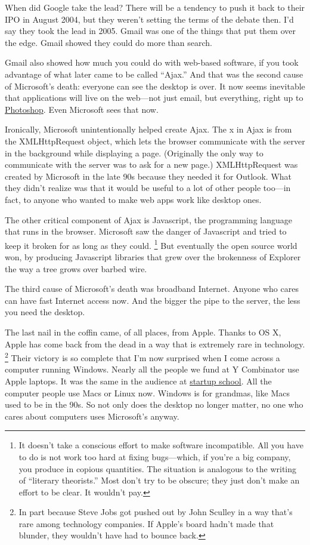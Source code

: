 When did Google take the lead? There will be a tendency to push it back
to their IPO in August 2004, but they weren't setting the terms of the
debate then. I'd say they took the lead in 2005. Gmail was one of the
things that put them over the edge. Gmail showed they could do more than
search.

Gmail also showed how much you could do with web-based software, if you
took advantage of what later came to be called ``Ajax.'' And that was
the second cause of Microsoft's death: everyone can see the desktop is
over. It now seems inevitable that applications will live on the
web---not just email, but everything, right up to
\href{http://snipshot.com}{Photoshop}. Even Microsoft sees that now.

Ironically, Microsoft unintentionally helped create Ajax. The x in Ajax
is from the XMLHttpRequest object, which lets the browser communicate
with the server in the background while displaying a page. (Originally
the only way to communicate with the server was to ask for a new page.)
XMLHttpRequest was created by Microsoft in the late 90s because they
needed it for Outlook. What they didn't realize was that it would be
useful to a lot of other people too---in fact, to anyone who wanted to
make web apps work like desktop ones.

The other critical component of Ajax is Javascript, the programming
language that runs in the browser. Microsoft saw the danger of
Javascript and tried to keep it broken for as long as they could.
\footnote{It doesn't take a conscious effort to make software
incompatible. All you have to do is not work too hard at fixing
bugs---which, if you're a big company, you produce in copious
quantities. The situation is analogous to the writing of ``literary
theorists.'' Most don't try to be obscure; they just don't make an
effort to be clear. It wouldn't pay.} But eventually the open source world won, by
producing Javascript libraries that grew over the brokenness of Explorer
the way a tree grows over barbed wire.

The third cause of Microsoft's death was broadband Internet. Anyone who
cares can have fast Internet access now. And the bigger the pipe to the
server, the less you need the desktop.

The last nail in the coffin came, of all places, from Apple. Thanks to
OS X, Apple has come back from the dead in a way that is extremely rare
in technology. \footnote{In part because Steve Jobs got pushed out by John Sculley in a
way that's rare among technology companies. If Apple's board hadn't made
that blunder, they wouldn't have had to bounce back.} Their victory is so complete that
I'm now surprised when I come across a computer running Windows. Nearly
all the people we fund at Y Combinator use Apple laptops. It was the
same in the audience at
\href{http://www.bosstalks.com/StartupSchool2007/all_macs_and_all_writing.jpg}{startup
school}. All the computer people use Macs or Linux now. Windows is for
grandmas, like Macs used to be in the 90s. So not only does the desktop
no longer matter, no one who cares about computers uses Microsoft's
anyway.

